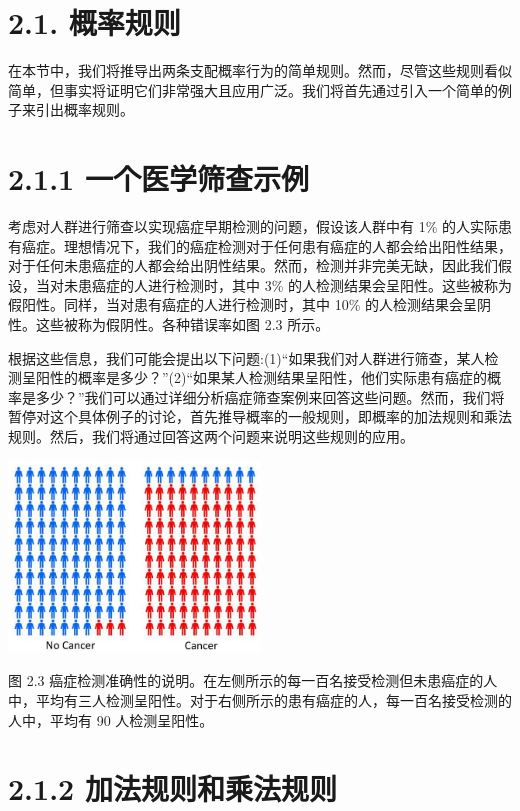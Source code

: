 \documentclass[10pt]{report}
\begin{document}
\section*{2.1. 概率规则}

在本节中，我们将推导出两条支配概率行为的简单规则。然而，尽管这些规则看似简单，但事实将证明它们非常强大且应用广泛。我们将首先通过引入一个简单的例子来引出概率规则。

\section*{2.1.1 一个医学筛查示例}

考虑对人群进行筛查以实现癌症早期检测的问题，假设该人群中有 1\% 的人实际患有癌症。理想情况下，我们的癌症检测对于任何患有癌症的人都会给出阳性结果，对于任何未患癌症的人都会给出阴性结果。然而，检测并非完美无缺，因此我们假设，当对未患癌症的人进行检测时，其中 3\% 的人检测结果会呈阳性。这些被称为假阳性。同样，当对患有癌症的人进行检测时，其中 10\% 的人检测结果会呈阴性。这些被称为假阴性。各种错误率如图 2.3 所示。

根据这些信息，我们可能会提出以下问题:(1)“如果我们对人群进行筛查，某人检测呈阳性的概率是多少？”(2)“如果某人检测结果呈阳性，他们实际患有癌症的概率是多少？”我们可以通过详细分析癌症筛查案例来回答这些问题。然而，我们将暂停对这个具体例子的讨论，首先推导概率的一般规则，即概率的加法规则和乘法规则。然后，我们将通过回答这两个问题来说明这些规则的应用。

\begin{center}
\includegraphics[max width=0.5\textwidth]{images/0194e279-9b28-703a-88f4-c3ac21e2010d_45_904_342_649_495_0.jpg}
\end{center}
\hspace*{3em} 

图 2.3 癌症检测准确性的说明。在左侧所示的每一百名接受检测但未患癌症的人中，平均有三人检测呈阳性。对于右侧所示的患有癌症的人，每一百名接受检测的人中，平均有 90 人检测呈阳性。

\section*{2.1.2 加法规则和乘法规则}
\end{document}
